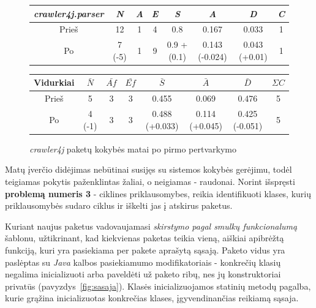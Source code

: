 \begin{figure}[H]
\begin{center}
    \begin{tabular}{|c|c|c|c|c|c|c|c|}
        \hline
        \textit{crawler4j.parser} & \textit{N} & \textit{A} & \textit{E} & \textit{S} & \textit{A} & \textit{D} & \textit{C} \\ [0.5ex]
        \hline\hline
        Prieš & 12 & 1 & 4 & 0.8 & 0.167 & 0.033 & 1 \\
        \hline
        Po & \cellcolor{green!25} 7 (-5) & 1 & 9 & \cellcolor{red!25} 0.9 + (0.1) & \cellcolor{red!25} 0.143 (-0.024) & \cellcolor{red!25} 0.043 (+0.01) & 1 \\
        \hline
    \end{tabular}
    \begin{tabular}{|c|c|c|c|c|c|c|c|}
        \hline
        Vidurkiai & $\bar{N}$ & $\bar{Af}$ & $\bar{Ef}$ & $\bar{S}$ & $\bar{A}$ & $\bar{D}$ & $\Sigma C$ \\ [0.5ex]
        \hline\hline
        Prieš & 5 & 3 & 3 & 0.455 & 0.069 & 0.476 & 5\\
        \hline
        Po & \cellcolor{green!25} 4 (-1) & 3 & 3 & \cellcolor{red!25} 0.488 (+0.033) & \cellcolor{green!25} 0.114 (+0.045) & \cellcolor{green!25} 0.425 (-0.051) & 5 \\
        \hline
    \end{tabular}
\end{center}
\caption{\textit{crawler4j} paketų kokybės matai po pirmo pertvarkymo}
\label{table:parsers}
\end{figure}
Matų įverčio didėjimas nebūtinai susijęs su sistemos kokybės gerėjimu, todėl teigiamas pokytis paženklintas žaliai, o neigiamas - raudonai.
Norint išspręsti \textbf{problemą numeris 3} - ciklines priklausomybes, reikia identifikuoti klases, kurių priklausomybės
sudaro ciklus ir iškelti jas į atskirus paketus.

Kuriant naujus paketus vadovaujamasi \textit{skirstymo pagal smulkų funkcionalumą} šablonu, užtikrinant, kad kiekvienas
paketas teikia vieną, aiškiai apibrėžtą funkciją, kuri yra pasiekiama per pakete aprašytą sąsają.
Paketo vidus yra paslėptas su \textit{Java} kalbos pasiekiamumo modifikatoriais - konkrečių klasių negalima inicializuoti arba paveldėti už paketo ribų,
nes jų konstruktoriai privatūs (pavyzdys~\ref{fig:sasaja}). Klasės inicializuojamos statinių metodų pagalba, kurie grąžina inicializuotas konkrečias klases, įgyvendinančias reikiamą
sąsaja.

